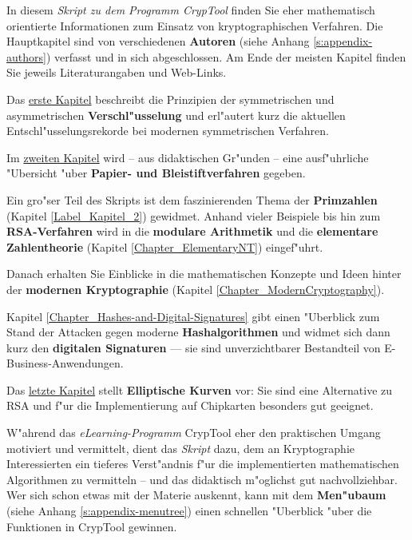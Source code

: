 \parskip 4pt
{
In diesem {\em Skript zu dem Programm CrypTool}  finden Sie
eher mathematisch orientierte Informationen zum Einsatz von
kryptographischen Verfahren. Die Hauptkapitel sind von
verschiedenen {\bf Autoren} (siehe Anhang \ref{s:appendix-authors})
verfasst und in sich abgeschlossen. Am Ende der meisten Kapitel finden Sie
jeweils Literaturangaben und Web-Links.

Das \hyperlink{Kapitel_1}{erste Kapitel} beschreibt die Prinzipien der
symmetrischen und asymmetrischen {\bf Verschl"usselung} und erl"autert 
kurz die aktuellen Entschl"usselungsrekorde bei modernen symmetrischen
Verfahren.

Im \hyperlink{Kapitel_PaperandPencil}{zweiten Kapitel} wird -- aus 
didaktischen Gr"unden -- eine ausf"uhrliche "Ubersicht
"uber {\bf Papier- und Bleistiftverfahren} gegeben.

Ein gro"ser Teil des Skripts ist dem faszinierenden Thema der
{\bf Primzahlen} (Kapitel \ref{Label_Kapitel_2})
gewidmet.
Anhand vieler Beispiele bis hin zum {\bf RSA-Verfahren} wird in die
{\bf modulare Arithmetik} und die 
{\bf elementare Zahlentheorie} (Kapitel \ref{Chapter_ElementaryNT})
eingef"uhrt.

Danach erhalten Sie Einblicke in die mathematischen Konzepte und
Ideen hinter der
{\bf modernen Kryptographie} (Kapitel \ref{Chapter_ModernCryptography}).

Kapitel \ref{Chapter_Hashes-and-Digital-Signatures} gibt
einen "Uberblick zum Stand der Attacken gegen moderne {\bf Hashalgorithmen}
und widmet sich dann kurz den {\bf digitalen Signaturen}
 --- sie sind unverzichtbarer Bestandteil von E-Business-Anwendungen.

Das \hyperlink{ellcurve}{letzte Kapitel} stellt {\bf Elliptische Kurven} vor:
Sie sind eine Alternative zu RSA und f"ur die Implementierung auf Chipkarten
besonders gut geeignet.

W"ahrend das \textit{eLearning-Programm} CrypTool eher den
praktischen Umgang motiviert und vermittelt, dient das \textit{Skript} dazu, 
dem an Kryptographie Interessierten ein tieferes Verst"andnis f"ur die 
implementierten mathematischen Algorithmen zu vermitteln -- und das 
didaktisch m"oglichst gut nachvollziehbar. 
Wer sich schon etwas mit der Materie auskennt, kann mit dem 
{\bf Men"ubaum} (siehe Anhang \ref{s:appendix-menutree})
einen schnellen "Uberblick "uber die Funktionen in CrypTool gewinnen.

}
